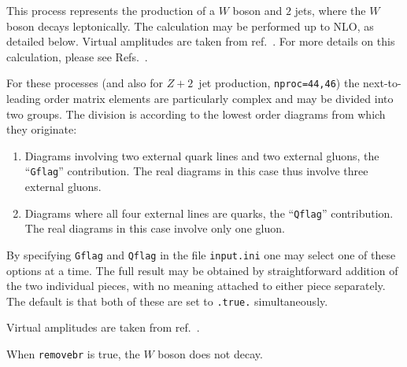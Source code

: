 \label{subsec:w2jets}

This process represents the production of a $W$ boson and $2$ jets,
where the $W$ boson decays leptonically. The calculation may be
performed up to NLO, as detailed below. Virtual amplitudes are
taken from ref.~\cite{Bern:1997sc}.
For more details on this calculation, please see
Refs.~\cite{Campbell:2002tg,Campbell:2003hd}.

For these processes (and also for $Z+2$~jet production, {\tt nproc=44,46})
the next-to-leading order matrix elements are
particularly complex and may be divided into two groups.
The division is according to the lowest order diagrams from which they
originate:
\begin{enumerate}
\item Diagrams involving two external quark lines and two external gluons,
the ``{\tt Gflag}'' contribution. The real diagrams in this case thus
involve three external gluons.

\item Diagrams where all four external lines are quarks,
the ``{\tt Qflag}'' contribution. The real diagrams in this case
involve only one gluon.
\end{enumerate}

By specifying {\tt Gflag} and {\tt Qflag} in the file {\tt input.ini} one may
select one of these options at a time. The full result may be obtained
by straightforward addition of the two individual pieces, with no
meaning attached to either piece separately.
The default is that both of these are set to {\tt .true.} simultaneously.

Virtual amplitudes are taken from ref.~\cite{Bern:1997sc}.

When {\tt removebr} is true, the $W$ boson does not decay.
